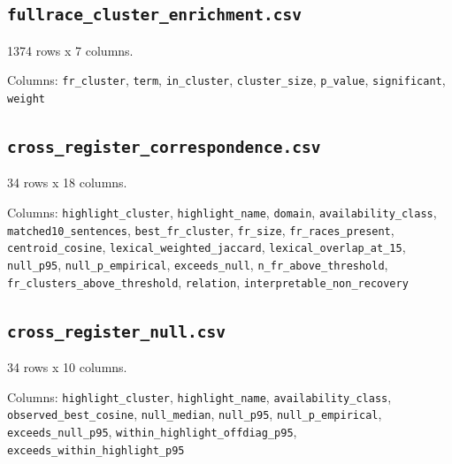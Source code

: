 \documentclass[10pt,a4paper]{article}
\begin{document}
\subsection*{\texttt{fullrace\_\allowbreak{}cluster\_\allowbreak{}enrichment.csv}}
1374 rows x 7 columns.

{\raggedright Columns: \texttt{fr\_\allowbreak{}cluster}, \texttt{term}, \texttt{in\_\allowbreak{}cluster}, \texttt{cluster\_\allowbreak{}size}, \texttt{p\_\allowbreak{}value}, \texttt{significant}, \texttt{weight}\par}

\subsection*{\texttt{cross\_\allowbreak{}register\_\allowbreak{}correspondence.csv}}
34 rows x 18 columns.

{\raggedright Columns: \texttt{highlight\_\allowbreak{}cluster}, \texttt{highlight\_\allowbreak{}name}, \texttt{domain}, \texttt{availability\_\allowbreak{}class}, \texttt{matched10\_\allowbreak{}sentences}, \texttt{best\_\allowbreak{}fr\_\allowbreak{}cluster}, \texttt{fr\_\allowbreak{}size}, \texttt{fr\_\allowbreak{}races\_\allowbreak{}present}, \texttt{centroid\_\allowbreak{}cosine}, \texttt{lexical\_\allowbreak{}weighted\_\allowbreak{}jaccard}, \texttt{lexical\_\allowbreak{}overlap\_\allowbreak{}at\_\allowbreak{}15}, \texttt{null\_\allowbreak{}p95}, \texttt{null\_\allowbreak{}p\_\allowbreak{}empirical}, \texttt{exceeds\_\allowbreak{}null}, \texttt{n\_\allowbreak{}fr\_\allowbreak{}above\_\allowbreak{}threshold}, \texttt{fr\_\allowbreak{}clusters\_\allowbreak{}above\_\allowbreak{}threshold}, \texttt{relation}, \texttt{interpretable\_\allowbreak{}non\_\allowbreak{}recovery}\par}

\subsection*{\texttt{cross\_\allowbreak{}register\_\allowbreak{}null.csv}}
34 rows x 10 columns.

{\raggedright Columns: \texttt{highlight\_\allowbreak{}cluster}, \texttt{highlight\_\allowbreak{}name}, \texttt{availability\_\allowbreak{}class}, \texttt{observed\_\allowbreak{}best\_\allowbreak{}cosine}, \texttt{null\_\allowbreak{}median}, \texttt{null\_\allowbreak{}p95}, \texttt{null\_\allowbreak{}p\_\allowbreak{}empirical}, \texttt{exceeds\_\allowbreak{}null\_\allowbreak{}p95}, \texttt{within\_\allowbreak{}highlight\_\allowbreak{}offdiag\_\allowbreak{}p95}, \texttt{exceeds\_\allowbreak{}within\_\allowbreak{}highlight\_\allowbreak{}p95}\par}
\end{document}
